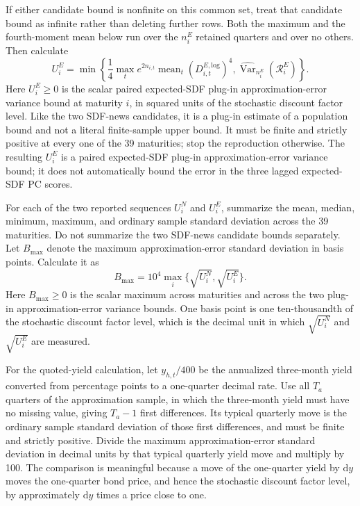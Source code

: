\documentclass[11pt]{article}
\begin{document}
If either candidate bound is nonfinite on this common set, treat that candidate bound as infinite rather
than deleting further rows.
Both the maximum and the fourth-moment mean below run over the \(n_i^E\) retained quarters and over no
others. Then calculate
\begin{equation*}
 U_i^E=\min\left\{
 \frac14\max_t e^{2n_{i,t}}\operatorname{mean}_t (D_{i,t}^{E,\mathrm{log}})^4,
 \widehat{\operatorname{Var}}_{n_i^E}(\mathcal R_i^E)
 \right\}.
\end{equation*}
Here \(U_i^E\ge0\) is the scalar paired expected-SDF plug-in approximation-error variance bound at
maturity \(i\), in squared units of the stochastic discount factor level. Like the two SDF-news
candidates, it is a plug-in estimate of a population bound and not a literal finite-sample upper
bound. It must be finite and strictly positive at every one of the 39 maturities; stop the
reproduction otherwise. The resulting \(U_i^E\)
is a paired expected-SDF plug-in approximation-error variance bound; it does not automatically bound
the error in the three lagged expected-SDF PC scores.

For each of the two reported sequences \(U_i^N\) and \(U_i^E\), summarize the mean, median, minimum,
maximum, and ordinary sample standard deviation across the 39 maturities. Do not summarize the two
SDF-news candidate bounds separately. Let
\(B_{\max}\) denote the maximum approximation-error standard deviation in basis points. Calculate it
as
\begin{equation*}
 B_{\max}=10^4\max_i\{\sqrt{U_i^N},\sqrt{U_i^E}\}.
\end{equation*}
Here \(B_{\max}\ge0\) is the scalar maximum across maturities and across the two plug-in
approximation-error variance bounds. One basis point is one ten-thousandth of the stochastic discount
factor level, which is the decimal unit in which \(\sqrt{U_i^N}\) and \(\sqrt{U_i^E}\) are measured.

For the quoted-yield calculation, let \(y_{h,t}/400\) be the annualized three-month yield converted
from percentage points to a one-quarter decimal rate. Use all \(T_a\) quarters of the approximation
sample, in which the three-month yield must have no missing value, giving \(T_a-1\) first differences.
Its typical quarterly move is the ordinary sample standard deviation of those first differences, and
must be finite and strictly positive. Divide the maximum approximation-error standard deviation in decimal units by
that typical quarterly yield move and multiply by 100. The comparison is meaningful because a move of the one-quarter
yield by \(\mathrm dy\) moves the one-quarter bond price, and hence the stochastic discount factor
level, by approximately \(\mathrm dy\) times a price close to one.
\end{document}
